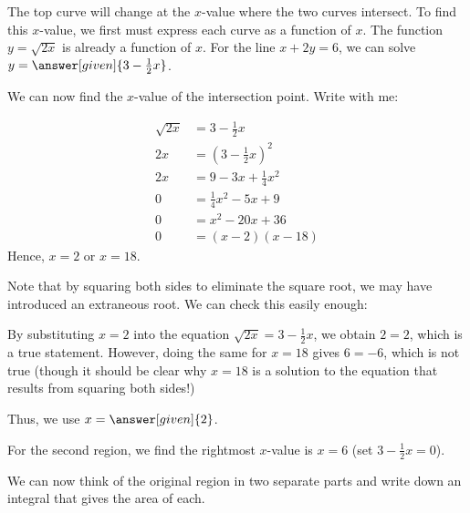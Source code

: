 \documentclass{ximera}
\begin{document}
\begin{example}

The top curve will change at the $x$-value where the two curves intersect.  To find this $x$-value, we first must express each curve as a function of $x$.  The function $y=\sqrt{2x}$ is already a function of $x$.  For the line $x+2y=6$, we can solve $y=\answer[given]{3- \frac{1}{2}x}$.

We can now find the $x$-value of the intersection point. Write with me:

\begin{align*}
\sqrt{2x} &= 3 -\frac{1}{2}x \\
2x &= \left(3 -\frac{1}{2}x\right)^2 \\
2x&= 9-3x+\frac{1}{4} x^2 \\
0 &= \frac{1}{4} x^2 -5x+9  \\
0 &= x^2 -20x+36  \\
0 &= (x-2)(x-18) 
\end{align*}
Hence, $x=2$ or $x=18$.  

Note that by squaring both sides to eliminate the square root, we may have introduced an extraneous root.  We can check this easily enough:

By substituting $x=2$ into the equation $\sqrt{2x} = 3-\frac{1}{2}x$, we obtain $2=2$, which is a true statement.  However, doing the same for $x=18$ gives $6 = -6$, which is not true (though it should be clear why $x=18$ is a solution to the equation that results from squaring both sides!) 

Thus, we use $x=\answer[given]{2}$.  

For the second region, we find the rightmost $x$-value is $x=6$ (set $3-\frac{1}{2}x=0$).

We can now think of the original region in two separate parts and write down an integral that gives the area of each.

   \begin{image}
\end{image}
\end{example}
\end{document}
